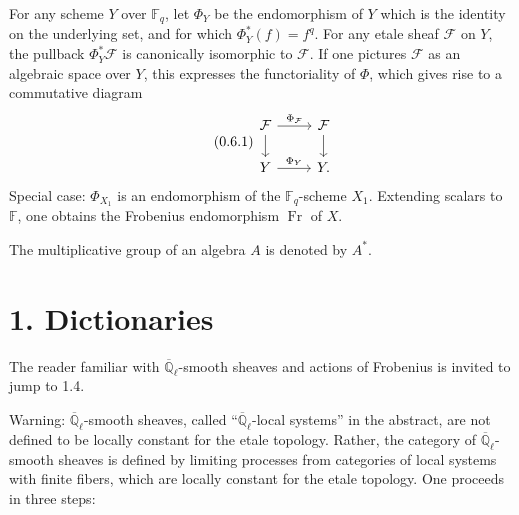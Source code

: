 \documentclass[10pt]{article}
\newcommand{\Fq}{\mathbb F_q}
\newcommand{\Fb}{\mathbb F}
\newcommand{\Ql}{\overline{\mathbb Q}_{\ell}}
\newcommand{\Fr}{\operatorname{Fr}}
\theoremstyle{deligne}
\newcommand{\heading}[1]{\vspace{0.7em}\noindent{\bfseries #1}\quad}
\begin{document}
\heading{0.6.} For any scheme $Y$ over $\Fq$, let $\Phi_Y$ be the endomorphism of $Y$ which is the identity on the underlying set, and for which $\Phi_Y^*(f)=f^q$. For any etale sheaf $\mathcal F$ on $Y$, the pullback $\Phi_Y^*\mathcal F$ is canonically isomorphic to $\mathcal F$. If one pictures $\mathcal F$ as an algebraic space over $Y$, this expresses the functoriality of $\Phi$, which gives rise to a commutative diagram
\begin{equation}\tag{0.6.1}
\begin{tikzcd}[column sep=2.4em,row sep=1.6em]
\mathcal F \arrow[r,"\Phi_{\mathcal F}"] \arrow[d] & \mathcal F \arrow[d]\\
Y \arrow[r,"\Phi_Y"] & Y .
\end{tikzcd}
\end{equation}
Special case: $\Phi_{X_1}$ is an endomorphism of the $\Fq$-scheme $X_1$. Extending scalars to $\Fb$, one obtains the Frobenius endomorphism $\Fr$ of $X$.

\heading{0.7.} The multiplicative group of an algebra $A$ is denoted by $A^*$.

\section*{1. Dictionaries}

The reader familiar with $\Ql$-smooth sheaves and actions of Frobenius is invited to jump to 1.4.

\heading{1.1.} Warning: $\Ql$-smooth sheaves, called ``$\Ql$-local systems'' in the abstract, are not defined to be locally constant for the etale topology. Rather, the category of $\Ql$-smooth sheaves is defined by limiting processes from categories of local systems with finite fibers, which are locally constant for the etale topology. One proceeds in three steps:
\end{document}
